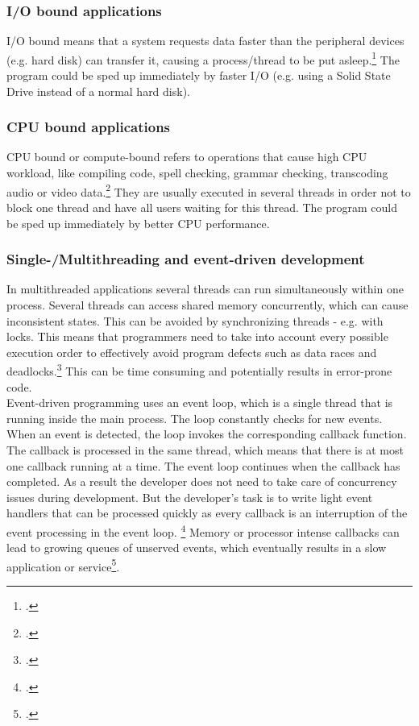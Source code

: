 \subsubsection{I/O bound applications}
\label{issue_io}
I/O bound means that a system requests data faster than the peripheral devices
(e.g. hard disk) can transfer it, causing a process/thread to be put
asleep.\footcite[Cf.][10]{Caldera_2003} The program could be sped up immediately
by faster I/O (e.g. using a Solid State Drive instead of a normal hard disk).

\subsubsection{CPU bound applications}
\label{issue_cpu}
CPU bound or compute-bound refers to operations that cause high CPU workload,
like compiling code, spell checking, grammar checking, transcoding audio or
video data.\footcite[Cf.][718]{Richter_2010} They are usually executed in
several threads in order not to block one thread and have all users waiting for
this thread. The program could be sped up immediately by better CPU performance.

\subsubsection{Single-/Multithreading and event-driven development}
\label{issue_threads}

In multithreaded applications several threads can run simultaneously within one 
process. Several threads can access shared memory concurrently, which can
cause inconsistent states. This can be avoided by synchronizing threads - e.g.
with locks. This means that programmers need to take into account every possible
execution order to effectively avoid program defects such as data races and 
deadlocks.\footcite[Cf.][10]{Breshears_2009}
This can be time consuming and potentially results in error-prone code.\\

Event-driven programming uses an event loop, which is a single thread that is
running inside the main process.
The loop constantly checks for new events. When an event is detected, the loop
invokes the corresponding callback function. The callback is processed in the
same thread, which means that there is at most one callback running at a time.
The event loop continues when the callback has completed. As a result the
developer does not need to take care of concurrency issues during development.
But the developer's task is to write light event handlers that can be processed
quickly as every callback is an interruption of the event processing in the
event loop. \footcite[Cf.][]{Croucher_2010} Memory or processor intense callbacks
can lead to growing queues of unserved events, which eventually results
in a slow application or service\footcite[Cf.][48]{teixeira_2012}.

